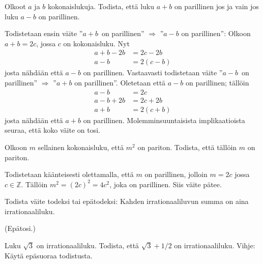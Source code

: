 \begin{tehtavasivu}
\begin{tehtava}
\begin{vastaus}
		\end{vastaus}
	\end{tehtava}

	\begin{tehtava}
		Olkoot $a$ ja $b$ kokonaislukuja. Todista, että luku
		$a + b$ on parillinen jos ja vain jos luku
		$a - b$ on parillinen.
		\begin{vastaus}
		Todistetaan ensin väite ''$a + b$ on parillinen'' $\Rightarrow$ ''$a - b$ on parillinen'': Olkoon $a+b = 2c$, jossa $c$ on kokonaisluku. Nyt
		\begin{align*}
		 a+b-2b &= 2c-2b \\
		 a-b &= 2(c-b) 
		\end{align*}
		josta nähdään että $a-b$ on parillinen. Vastaavasti todistetaan väite ''$a - b$ on parillinen'' $\Rightarrow$ ''$a + b$ on parillinen''. Oletetaan että $a-b$ on parillinen; tällöin
		\begin{align*}
		a - b &= 2c \\
		a-b+2b &= 2c + 2b \\
		a+b &= 2(c+b) 
		\end{align*}
		josta nähdään että $a+b$ on parillinen. Molemminsuuntaisista implikaatioista seuraa, että koko väite on tosi. %

		\end{vastaus}
	\end{tehtava}

	\begin{tehtava}
		Olkoon $m$ sellainen kokonaisluku, että $m^2$ on
		pariton. Todista, että tällöin $m$ on pariton.
		\begin{vastaus}
		Todistetaan käänteisesti olettamalla, että $m$ on parillinen, jolloin $m = 2c$ jossa $c \in \mathbb{Z}$. Tällöin $m^2 = (2c)^2 = 4c^2$, joka on parillinen. Siis väite pätee.
		\end{vastaus}
	\end{tehtava}

	\begin{tehtava}
		Todista väite todeksi tai epätodeksi: Kahden
		irrationaaliluvun summa on aina irrationaaliluku.
		\begin{vastaus}
			(Epätosi.)
		\end{vastaus}
	\end{tehtava}

	\begin{tehtava}
		Luku $\sqrt{3}$ on irrationaaliluku. Todista,
		että $\sqrt{3}+1/2$ on irrationaaliluku. Vihje: Käytä
		epäsuoraa todistusta.
		\begin{vastaus}
		\end{vastaus}
	\end{tehtava}


\end{tehtavasivu}
